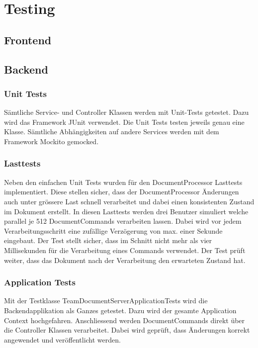 \section{Testing}
\subsection{Frontend}

\subsection{Backend}

\subsubsection{Unit Tests}

Sämtliche Service- und Controller Klassen werden mit Unit-Tests getestet.
Dazu wird das Framework JUnit verwendet.
Die Unit Tests testen jeweils genau eine Klasse.
Sämtliche Abhängigkeiten auf andere Services werden mit dem Framework Mockito gemocked.

\subsubsection{Lasttests}

Neben den einfachen Unit Tests wurden für den DocumentProcessor Lasttests implementiert.
Diese stellen sicher, dass der DocumentProcessor Änderungen auch unter grössere Last schnell verarbeitet und dabei einen konsistenten Zustand im Dokument erstellt.
In diesen Lasttests werden drei Benutzer simuliert welche parallel je 512 DocumentCommands verarbeiten lassen.
Dabei wird vor jedem Verarbeitungsschritt eine zufällige Verzögerung von max. einer Sekunde eingebaut.
Der Test stellt sicher, dass im Schnitt nicht mehr als vier Millisekunden für die Verarbeitung eines Commands verwendet.
Der Test prüft weiter, dass das Dokument nach der Verarbeitung den erwarteten Zustand hat.

\subsubsection{Application Tests}

Mit der Testklasse TeamDocumentServerApplicationTests wird die Backendapplikation als Ganzes getestet.
Dazu wird der gesamte Application Context hochgefahren.
Anschliessend werden DocumentCommands direkt über die Controller Klassen verarbeitet.
Dabei wird geprüft, dass Änderungen korrekt angewendet und veröffentlicht werden.


